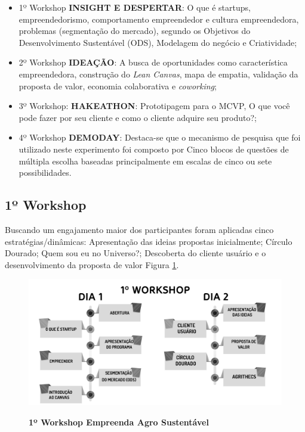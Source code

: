 \begin{itemize}

\item {1º Workshop \textbf{INSIGHT E DESPERTAR}: O que é startups, empreendedorismo, comportamento empreendedor e cultura empreendedora, problemas (segmentação do mercado), segundo os Objetivos do Desenvolvimento Sustentável (ODS), Modelagem do negócio e Criatividade;}
\item {2º Workshop \textbf{IDEAÇÃO}: A busca de oportunidades como característica empreendedora, construção do \textit{Lean Canvas}, mapa de empatia, validação da proposta de valor, economia colaborativa e \textit{coworking};}

\item {3º Workshop: \textbf{HAKEATHON}: Prototipagem para o MCVP, O que você pode fazer por seu cliente e como o cliente adquire seu produto?;}

\item {4º Workshop \textbf{DEMODAY}: Destaca-se que o mecanismo de pesquisa que foi utilizado neste experimento foi composto por Cinco blocos de questões de múltipla escolha baseadas principalmente em escalas de cinco ou sete possibilidades.}
\end{itemize}


\subsection{1º Workshop}

Buscando um engajamento maior dos participantes foram
aplicadas cinco estratégias/dinâmicas: Apresentação das ideias propostas inicialmente; Círculo Dourado;
Quem sou eu no Universo?; Descoberta do cliente usuário e o  desenvolvimento da proposta de valor Figura \ref{figura_30}.

\begin{figure}[!h]
\centering
\caption{\textbf{1º Workshop Empreenda Agro Sustentável}}
\includegraphics[scale=0.3]{Imagens/workshop-01.png}
\label{figura_30}
\end{figure}

